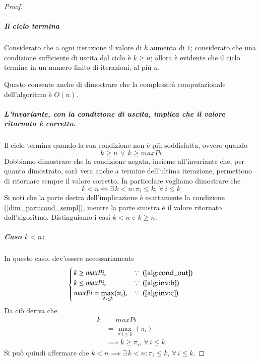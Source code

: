 \documentclass[../../../relazione.tex]{subfiles}
\begin{document}
\begin{proof}
\begin{itemize}
    \end{itemize}

    \subparagraph{Il ciclo termina}
    Considerato che a ogni iterazione il valore di $k$ aumenta di $1$;
    considerato che una condizione sufficiente di uscita dal ciclo è $k \geq n$;
    allora è evidente che il ciclo termina in un numero finito di iterazioni, al più $n$.

    Questo consente anche di dimostrare che la complessità computazionale dell'algoritmo è $O(n)$.

    \subparagraph{L'invariante, con la condizione di uscita, implica che il valore ritornato è corretto.}
    Il ciclo termina quando la sua condizione non è più soddisfatta, ovvero quando
    \begin{equation}\label{alg:cond_out}
        k \geq n\, \vee\, k \geq maxPi
    \end{equation}
    Dobbiamo dimostrare che la condizione negata, insieme all'invariante che, per quanto dimostrato, sarà vera anche a termine dell'ultima iterazione, permettono di ritornare sempre il valore corretto.
    In particolare vogliamo dimostrare che
    \[ k < n \iff \exists\, k < n : \pi_i \leq k,\, \forall\, i \leq k \]
    Si noti che la parte destra dell'implicazione è esattamente la condizione (\ref{dim_part:cond_sempl}), mentre la parte sinistra è il valore ritornato dall'algoritmo.
    Distinguiamo i casi $k < n$ e $k \geq n$.

    \subparagraph{Caso $k < n$:}
    In questo caso, dev'essere necessariamente
    \begin{equation*}
        \begin{cases}
            k \geq maxPi \mbox{,}                                          & \because \mbox{ (\ref{alg:cond_out})} \\
            k \leq maxPi \mbox{,}                                          & \because \mbox{ (\ref{alg:inv:b})}    \\
            maxPi = \displaystyle\max_{\forall\, i \leq k}(\pi_i) \mbox{,} & \because \mbox{ (\ref{alg:inv:c})}
        \end{cases}
    \end{equation*}
    Da ciò deriva che
    \begin{align*}
        k & = maxPi                                     \\
          & = \max_{\forall\, i \leq k}(\pi_i)          \\
          & \implies k \geq \pi_i,\, \forall\, i \leq k
    \end{align*}
    Si può quindi affermare che $k < n \implies \exists\, k < n : \pi_i \leq k,\, \forall\, i \leq k$.


\end{proof}
\end{document}
